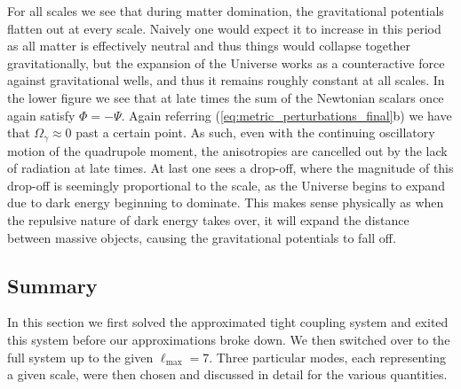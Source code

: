 \documentclass[%
reprint,
 amsmath,amssymb,
 aps,
]{revtex4-2}
\begin{document}
For all scales we see that during matter domination, the gravitational potentials flatten out at every scale. Naively one would expect it to increase in this period as all matter is effectively neutral and thus things would collapse together gravitationally, but the expansion of the Universe works as a counteractive force against gravitational wells, and thus it remains roughly constant at all scales. In the lower figure we see that at late times the sum of the Newtonian scalars once again satisfy $\Phi=-\Psi$. Again referring (\ref{eq:metric_perturbations_final}b) we have that $\Omega_\gamma\approx0$ past a certain point. As such, even with the continuing oscillatory motion of the quadrupole moment, the anisotropies are cancelled out by the lack of radiation at late times.  At last one sees a drop-off, where the magnitude of this drop-off is seemingly proportional to the scale, as the Universe begins to expand due to dark energy beginning to dominate. This makes sense physically as when the repulsive nature of dark energy takes over, it will expand the distance between massive objects, causing the gravitational potentials to fall off.

\subsection{Summary}
In this section we first solved the approximated tight coupling system and exited this system before our approximations broke down. We then switched over to the full system up to the given $\ell_\text{max}=7$. Three particular modes, each representing a given scale, were then chosen and discussed in detail for the various quantities. 
\end{document}
